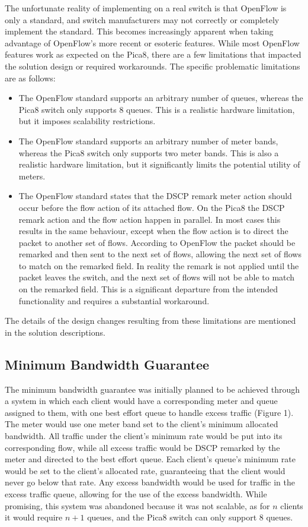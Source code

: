\documentclass[accepted,single]{gipaper}
\begin{document}
The unfortunate reality of implementing on a real switch is that OpenFlow is only a standard, and switch manufacturers may not correctly or completely implement the standard. This becomes increasingly apparent when taking advantage of OpenFlow's more recent or esoteric features. While most OpenFlow features work as expected on the Pica8, there are a few limitations that impacted the solution design or required workarounds. The specific problematic limitations are as follows: 

\begin{itemize}
\item The OpenFlow standard supports an arbitrary number of queues, whereas the Pica8 switch only supports 8 queues. This is a realistic hardware limitation, but it imposes scalability restrictions.
\item The OpenFlow standard supports an arbitrary number of meter bands, whereas the Pica8 switch only supports two meter bands. This is also a realistic hardware limitation, but it significantly limits the potential utility of meters.
\item The OpenFlow standard states that the DSCP remark meter action should occur before the flow action of its attached flow. On the Pica8 the DSCP remark action and the flow action happen in parallel. In most cases this results in the same behaviour, except when the flow action is to direct the packet to another set of flows. According to OpenFlow the packet should be remarked and then sent to the next set of flows, allowing the next set of flows to match on the remarked field. In reality the remark is not applied until the packet leaves the switch, and the next set of flows will not be able to match on the remarked field. This is a significant departure from the intended functionality and requires a substantial workaround.
\end{itemize}

The details of the design changes resulting from these limitations are mentioned in the solution descriptions. 

\subsection{Minimum Bandwidth Guarantee}
\label{min_bandwidth}


The minimum bandwidth guarantee was initially planned to be achieved through a system in which each client would have a corresponding meter and queue assigned to them, with one best effort queue to handle excess traffic (Figure 1). The meter would use one meter band set to the client's minimum allocated bandwidth. All traffic under the client's minimum rate would be put into its corresponding flow, while all excess traffic would be DSCP remarked by the meter and directed to the best effort queue. Each client's queue's minimum rate would be set to the client's allocated rate, guaranteeing that the client would never go below that rate. Any excess bandwidth would be used for traffic in the excess traffic queue, allowing for the use of the excess bandwidth. While promising, this system was abandoned because it was not scalable, as for $n$ clients it would require $n+1$ queues, and the Pica8 switch can only support 8 queues.\\
\end{document}
